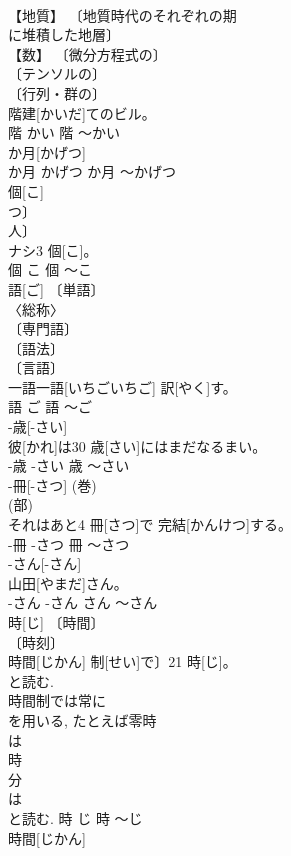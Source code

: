 \documentclass[8pt]{extreport}
\begin{document}
\begin{CJK}{UTF8}{min}
\\	【地質】 〔地質時代のそれぞれの期 
\\	に堆積した地層〕 
\\	【数】 〔微分方程式の〕 
\\	〔テンソルの〕 
\\	〔行列・群の〕 
\\	階建[かいだ]てのビル。	
\\	階	かい	階	〜かい	
\\	か月[かげつ]	
\\	か月	かげつ	か月	〜かげつ	
\\	個[こ]	
\\	つ〕 
\\	人〕 
\\	ナシ3 個[こ]。	
\\	個	こ	個	〜こ	
\\	語[ご]	〔単語〕 
\\	〈総称〉 
\\	〔専門語〕 
\\	〔語法〕 
\\	〔言語〕 
\\	[⇒ことば]	一語一語[いちごいちご] 訳[やく]す。	
\\	語	ご	語	〜ご	
\\	-歳[-さい]	
\\	彼[かれ]は30 歳[さい]にはまだなるまい。	
\\	-歳	-さい	歳	〜さい	
\\	-冊[-さつ]	(巻) 
\\	(部) 
\\	それはあと4 冊[さつ]で 完結[かんけつ]する。	
\\	-冊	-さつ	冊	〜さつ	
\\	-さん[-さん]	
\\	[⇒-さま]	山田[やまだ]さん。	
\\	-さん	-さん	さん	〜さん	
\\	時[じ]	〔時間〕 
\\	〔時刻〕 
\\	時間[じかん] 制[せい]で〕21 時[じ]。	
\\	と読む. 
\\	時間制では常に 
\\	を用いる, たとえば零時 
\\	は 
\\	時 
\\	分 
\\	は 
\\	と読む.	時	じ	時	〜じ	
\\	時間[じかん]	

\end{CJK}
\end{document}
